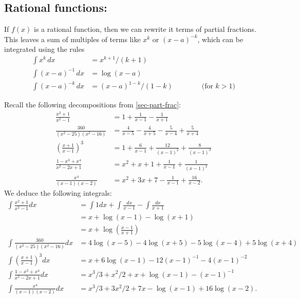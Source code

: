 \documentclass[a4paper]{book}
\theoremstyle{definition}
\begin{document}
\subsection{Rational functions:}
\label{subsec-rational-int}

If $f(x)$ is a rational function, then we can rewrite it terms of
partial fractions.  This leaves a sum of multiples of terms like $x^k$
or $(x-a)^{-k}$, which can be integrated using the rules 
\begin{align*}
 \int x^k\,dx &= x^{k+1}/(k+1) \\
 \int (x-a)^{-1}\, dx &= \log(x-a) \\
 \int (x-a)^{-k}\, dx &= (x-a)^{1-k}/(1-k) 
   \hspace{4em} \text{(for $k>1$)} 
\end{align*}

Recall the following decompositions from
\autoref{sec-part-frac}:
\begin{align*}
  \frac{x^2+1}{x^2-1}
   &= 1 + \frac{1}{x-1} - \frac{1}{x+1} \\
  \frac{360}{(x^2-25)(x^2-16)}
   &= \frac{4}{x-5} - \frac{4}{x+5} - \frac{5}{x-4} + \frac{5}{x+4} \\
  \left(\frac{x+1}{x-1}\right)^3
   &= 1 + \frac{6}{x-1} + \frac{12}{(x-1)^2} + \frac{8}{(x-1)^3} \\
  \frac{1-x^3+x^4}{x^2-2x+1}
   &= x^2 + x + 1 + \frac{1}{x-1} + \frac{1}{(x-1)^2} \\
  \frac{x^4}{(x-1)(x-2)}
   &= x^2 + 3x + 7 - \frac{1}{x-1} + \frac{16}{x-2}.
\end{align*}
We deduce the following integrals:
\begin{align*}
  \int\frac{x^2+1}{x^2-1}dx
   &= \int 1 dx + \int \frac{dx}{x-1} - \int\frac{dx}{x+1} \\
   &= x + \log(x-1) - \log(x+1) \\
   &= x + \log\left(\frac{x-1}{x+1}\right) \\
  \int\frac{360}{(x^2-25)(x^2-16)}dx
   &= 4\log(x-5) - 4\log(x+5) - 5\log(x-4) + 5\log(x+4) \\
  \int\left(\frac{x+1}{x-1}\right)^3 dx
   &= x + 6\log(x-1) - 12(x-1)^{-1} - 4(x-1)^{-2} \\
  \int\frac{1-x^3+x^4}{x^2-2x+1} dx
   &= x^3/3 + x^2/2 + x + \log(x-1) - (x-1)^{-1} \\
  \int\frac{x^4}{(x-1)(x-2)} dx
   &= x^3/3 + 3x^2/2 + 7x - \log(x-1) + 16\log(x-2).
\end{align*}
\end{document}
